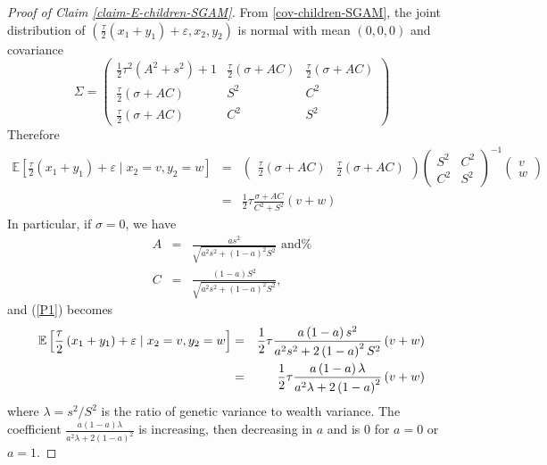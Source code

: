\documentclass[
]{article}
\theoremstyle{definition}
\theoremstyle{definition}
\theoremstyle{definition}
\theoremstyle{definition}
\theoremstyle{remark}
\begin{document}
\begin{proof}[Proof of Claim \ref{claim-E-children-SGAM}]

From \eqref{cov-children-SGAM}, the joint distribution of $\left( \frac{\tau }{2}\left(
x_{1}+y_{1}\right) +\varepsilon ,x_{2},y_{2}\right) $ is normal with mean $%
\left( 0,0,0\right) $ and covariance$\allowbreak $%
\[
\Sigma =\left( 
\begin{array}{rrr}
\frac{1}{2}\tau ^{2}\left( A^{2}+s^{2}\right) +1 & \frac{\tau }{2}\left(
\sigma +AC\right)  & \frac{\tau }{2}\left( \sigma +AC\right)  \\ 
\frac{\tau }{2}\left( \sigma +AC\right)  & S^{2} & C^{2} \\ 
\frac{\tau }{2}\left( \sigma +AC\right)  & C^{2} & S^{2}%
\end{array}%
\right) 
\]%
Therefore
\begin{eqnarray}
\mathbb{E}\left[ \frac{\tau }{2}\left( x_{1}+y_{1}\right) +\varepsilon \mid
x_{2}=v,y_{2}=w\right]  &=&\left( 
\begin{array}{rr}
\frac{\tau }{2}\left( \sigma +AC\right)  & \frac{\tau }{2}\left( \sigma
+AC\right) 
\end{array}%
\right) \left( 
\begin{array}{rr}
S^{2} & C^{2} \\ 
C^{2} & S^{2}%
\end{array}%
\right) ^{-1}\left( 
\begin{array}{r}
v \\ 
w%
\end{array}%
\right)   \nonumber \\
&=&\frac{1}{2}\tau \frac{\sigma +AC}{C^{2}+S^{2}}\left( v+w\right) 
\label{P1}
\end{eqnarray}%
In particular, if $\sigma =0$, we have%
\begin{eqnarray*}
A &=&\frac{as^{2}}{\sqrt{a^{2}s^{2}+\left( 1-a\right) ^{2}S^{2}}}\textrm{ \ and%
} \\
C &=&\frac{\left( 1-a\right) S^{2}}{\sqrt{a^{2}s^{2}+\left( 1-a\right)
^{2}S^{2}}},
\end{eqnarray*}%
and (\ref{P1}) becomes 
\begin{eqnarray*}
\mathbb{E}\left[ \frac{\tau }{2}\left( x_{1}+y_{1}\right) +\varepsilon \mid
x_{2}=v,y_{2}=w\right]  &=&\frac{1}{2}\tau \frac{a\left( 1-a\right) s^{2}}{%
a^{2}s^{2}+2\left( 1-a\right) ^{2}S^{2}}\left( v+w\right)  \\
&=&\frac{1}{2}\tau \frac{a\left( 1-a\right) \lambda }{a^{2}\lambda +2\left(
1-a\right) ^{2}}\left( v+w\right) 
\end{eqnarray*}
where $\lambda =s^{2}/S^{2}$ is the ratio of genetic variance to wealth variance.
The coefficient $\frac{a\left( 1-a\right) \lambda }{a^{2}\lambda +2\left(
1-a\right) ^{2}}$ is increasing, then decreasing in $a$ and is 0 for $a =  0$ or $a = 1$.
\end{proof}
\end{document}

